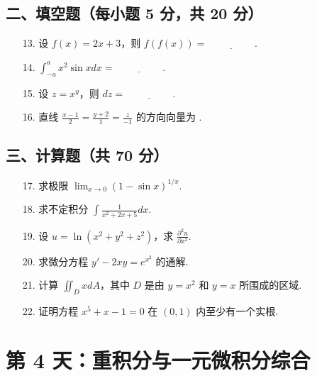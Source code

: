 \documentclass[11pt,a4paper]{article}
\begin{document}
\subsection*{二、填空题（每小题 5 分，共 20 分）}
\begin{enumerate}
    \item[13.] 设 $f(x) = 2x+3$，则 $f(f(x)) = \underline{\hspace{2cm}}$.
    \item[14.] $\int_{-a}^{a} x^2 \sin x dx = \underline{\hspace{2cm}}$.
    \item[15.] 设 $z = x^y$，则 $dz = \underline{\hspace{2cm}}$.
    \item[16.] 直线 $\frac{x-1}{2} = \frac{y+2}{1} = \frac{z}{-1}$ 的方向向量为 \underline{\hspace{2cm}}.
\end{enumerate}
\subsection*{三、计算题（共 70 分）}
\begin{enumerate}
    \item[17.] 求极限 $\lim_{x \to 0} (1 - \sin x)^{1/x}$.
    \item[18.] 求不定积分 $\int \frac{1}{x^2+2x+5} dx$.
    \item[19.] 设 $u = \ln(x^2+y^2+z^2)$，求 $\frac{\partial^2 u}{\partial x^2}$.
    \item[20.] 求微分方程 $y' - 2xy = e^{x^2}$ 的通解.
    \item[21.] 计算 $\iint_D x dA$，其中 $D$ 是由 $y=x^2$ 和 $y=x$ 所围成的区域.
    \item[22.] 证明方程 $x^5 + x - 1 = 0$ 在 $(0, 1)$ 内至少有一个实根.
\end{enumerate}

\newpage

\section*{第 4 天：重积分与一元微积分综合}
\end{document}
